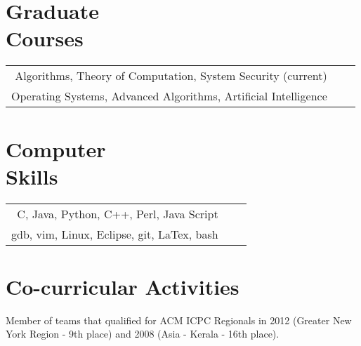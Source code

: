 \documentclass [margin] {res}
\begin{document}
\begin{resume}

	
\section{Graduate \\ Courses}
   \begin{tabular}{rl p{3in}}
   Algorithms, Theory of Computation, System Security (current)\\
   Operating Systems, Advanced Algorithms, Artificial Intelligence\\
\end{tabular}

\section{Computer \\ Skills}
   \begin{tabular}{rl p{3in}}
   C, Java, Python, C++, Perl, Java Script  \\
   gdb, vim, Linux, Eclipse, git, LaTex, bash\\
\end{tabular}

\section{Co-curricular Activities}
Member of teams that qualified for ACM ICPC Regionals in 2012 (Greater New York Region - 9th place) and 2008 (Asia - Kerala - 16th place).
\end{resume} 
\end{document}
